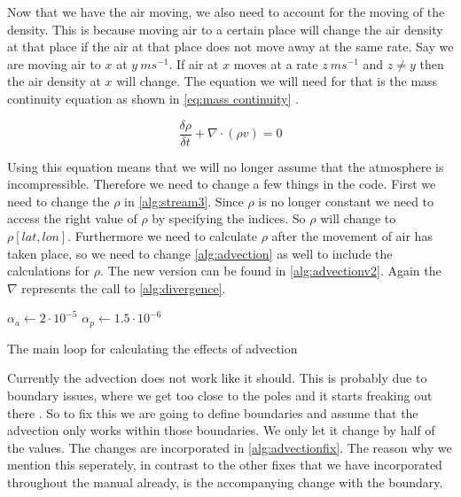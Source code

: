 Now that we have the air moving, we also need to account for the moving of the density. This is because moving air to a certain place will change the air density at that place if the air at that 
place does not move away at the same rate. Say we are moving air to $x$ at $y \ ms^{-1}$. If air at $x$ moves at a rate $z \ ms^{-1}$ and $z \neq y$ then the air density at $x$ will change.
The equation we will need for that is the mass continuity equation as shown in \autoref{eq:mass continuity} \cite{masscontinue}.

\begin{equation}
    \frac{\delta \rho}{\delta t} + \nabla \cdot (\rho v) = 0
    \label{eq:mass continuity}
\end{equation}

Using this equation means that we will no longer assume that the atmosphere is incompressible. Therefore we need to change a few things in the code. First we need to change the $\rho$ in 
\autoref{alg:stream3}. Since $\rho$ is no longer constant we need to access the right value of $\rho$ by specifying the indices. So $\rho$ will change to $\rho[lat, lon]$. Furthermore we need
to calculate $\rho$ after the movement of air has taken place, so we need to change \autoref{alg:advection} as well to include the calculations for $\rho$. The new version can be found in 
\autoref{alg:advectionv2}. Again the $\nabla$ represents the call to \autoref{alg:divergence}.


\begin{algorithm}
    $\alpha_a \leftarrow 2 \cdot 10^{-5}$ \;
    $\alpha_p \leftarrow 1.5 \cdot 10^{-6}$ \;
    \caption{The main loop for calculating the effects of advection}
    \label{alg:advectionv2}
\end{algorithm}

Currently the advection does not work like it should. This is probably due to boundary issues, where we get too close to the poles and it starts freaking out there \cite{simon}. So to fix this 
we are going to define boundaries and assume that the advection only works within those boundaries. We only let it change by half of the values. The changes are incorporated in 
\autoref{alg:advectionfix}. The reason why we mention this seperately, in contrast to the other fixes that we have incorporated throughout the manual already, is the accompanying change with the 
boundary. 


